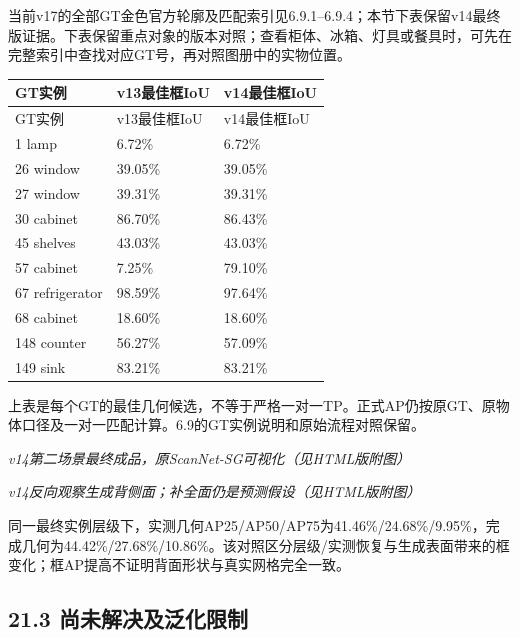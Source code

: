 \documentclass[UTF8,fontset=fandol]{ctexart}
\begin{document}
当前v17的全部GT金色官方轮廓及匹配索引见6.9.1–6.9.4；本节下表保留v14最终版证据。下表保留重点对象的版本对照；查看柜体、冰箱、灯具或餐具时，可先在完整索引中查找对应GT号，再对照图册中的实物位置。



{\small
\begin{longtable}{|p{}|p{}|p{}|}
\hline
GT实例 & v13最佳框IoU & v14最佳框IoU \\ \hline
\endfirsthead
\hline
GT实例 & v13最佳框IoU & v14最佳框IoU \\ \hline
\endhead
1 lamp & 6.72\% & 6.72\% \\ \hline
26 window & 39.05\% & 39.05\% \\ \hline
27 window & 39.31\% & 39.31\% \\ \hline
30 cabinet & 86.70\% & 86.43\% \\ \hline
45 shelves & 43.03\% & 43.03\% \\ \hline
57 cabinet & 7.25\% & 79.10\% \\ \hline
67 refrigerator & 98.59\% & 97.64\% \\ \hline
68 cabinet & 18.60\% & 18.60\% \\ \hline
148 counter & 56.27\% & 57.09\% \\ \hline
149 sink & 83.21\% & 83.21\% \\ \hline
\end{longtable}
}

上表是每个GT的最佳几何候选，不等于严格一对一TP。正式AP仍按原GT、原物体口径及一对一匹配计算。6.9的GT实例说明和原始流程对照保留。



\textit{v14第二场景最终成品，原ScanNet-SG可视化（见HTML版附图）}



\textit{v14反向观察生成背侧面；补全面仍是预测假设（见HTML版附图）}



同一最终实例层级下，实测几何AP25/AP50/AP75为41.46\%/24.68\%/9.95\%，完成几何为44.42\%/27.68\%/10.86\%。该对照区分层级/实测恢复与生成表面带来的框变化；框AP提高不证明背面形状与真实网格完全一致。



\subsection*{21.3 尚未解决及泛化限制}
\end{document}
